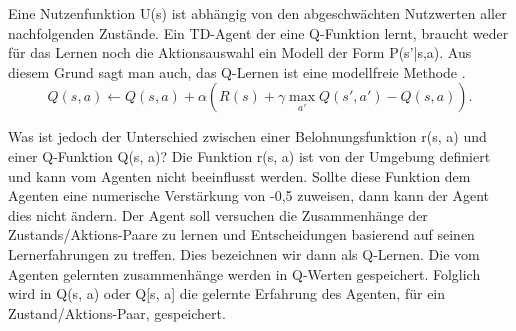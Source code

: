 Eine Nutzenfunktion U(s) ist abhängig von den abgeschwächten Nutzwerten aller nachfolgenden Zustände. Ein TD-Agent der eine Q-Funktion lernt, braucht weder für das Lernen noch die Aktionsauswahl ein Modell der Form P(s'|s,a). Aus diesem Grund sagt man auch, das Q-Lernen ist eine modellfreie Methode \cite[974]{Russell}. \\

\begin{equation}
Q(s,a) \leftarrow Q(s,a) + \alpha(R(s) + \gamma \max_{a'} Q(s',a') - Q(s,a)).
\end{equation}

Was ist jedoch der Unterschied zwischen einer Belohnungsfunktion r(s, a) und einer Q-Funktion Q(s, a)? Die Funktion r(s, a) ist von der Umgebung definiert und kann vom Agenten nicht beeinflusst werden. Sollte diese Funktion dem Agenten eine numerische Verstärkung von -0,5 zuweisen, dann kann der Agent dies nicht ändern. Der Agent soll versuchen die Zusammenhänge der Zustands/Aktions-Paare zu lernen und Entscheidungen basierend auf seinen Lernerfahrungen zu treffen. Dies bezeichnen wir dann als Q-Lernen. Die vom Agenten gelernten zusammenhänge werden in Q-Werten gespeichert. Folglich wird in Q(s, a) oder Q[s, a] die gelernte Erfahrung des Agenten, für ein Zustand/Aktions-Paar, gespeichert. \\
